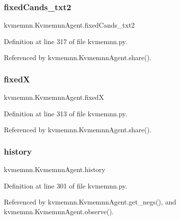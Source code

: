 \subsubsection{\texorpdfstring{fixed\+Cands\+\_\+txt2}{fixedCands\_txt2}}
{\footnotesize\ttfamily kvmemnn.\+Kvmemnn\+Agent.\+fixed\+Cands\+\_\+txt2}



Definition at line 317 of file kvmemnn.\+py.



Referenced by kvmemnn.\+Kvmemnn\+Agent.\+share().

\mbox{\label{classkvmemnn_1_1KvmemnnAgent_a08acbbc59ff955add282f0e502b94cfe}} 
\subsubsection{\texorpdfstring{fixedX}{fixedX}}
{\footnotesize\ttfamily kvmemnn.\+Kvmemnn\+Agent.\+fixedX}



Definition at line 313 of file kvmemnn.\+py.



Referenced by kvmemnn.\+Kvmemnn\+Agent.\+share().

\mbox{\label{classkvmemnn_1_1KvmemnnAgent_a732ab44660d83f2052b1440efbc2d5e2}} 
\subsubsection{\texorpdfstring{history}{history}}
{\footnotesize\ttfamily kvmemnn.\+Kvmemnn\+Agent.\+history}



Definition at line 301 of file kvmemnn.\+py.



Referenced by kvmemnn.\+Kvmemnn\+Agent.\+get\+\_\+negs(), and kvmemnn.\+Kvmemnn\+Agent.\+observe().

\mbox{\label{classkvmemnn_1_1KvmemnnAgent_af916a421898a2fa6d5ce4f6b279635a4}} 
